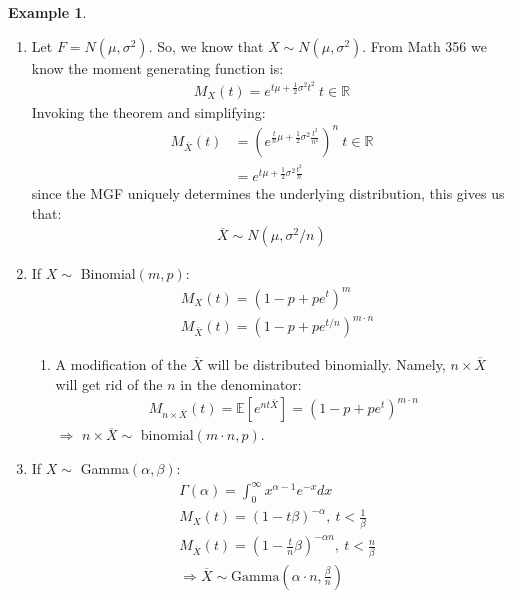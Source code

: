 \documentclass[11pt]{scrartcl}
\newcommand{\R}[0]{\mathbb{R}}
\theoremstyle{definition}
\newtheorem{ex}{Example}
\theoremstyle{remark}
\newcommand{\EX}[1]{\mathbb{E}\left[#1 \right]}
\newcommand{\idx}[2]{\int_{#1}^{#2}}
\begin{document}
{\begin{ex}
	\begin{enumerate}[noitemsep]
		\item Let $F = N(\mu, \sigma^2)$. So, we know that $X \sim N(\mu, \sigma^2)$. From Math 356 we know the moment generating function is: 
		\begin{align*}
			M_X(t) = e^{t\mu + \frac{1}{2} \sigma^2 t^2}\ t \in \R	
		\end{align*}
		Invoking the theorem and simplifying:  
		\begin{align*}
			M_{\overline{X}} (t) & = \left(e^{\frac{t}{n}\mu + \frac{1}{2} \sigma^2 \frac{t^2}{n^2}} \right)^n\ t \in \R	\\
			& = e^{t\mu + \frac{1}{2} \sigma^2\frac{t^2}{n}} 
		\end{align*}
		since the MGF uniquely determines the underlying distribution, this gives us that: 
		\begin{align*}
			\overline{X} \sim N(\mu, \sigma^2/n) 	
		\end{align*}
		\item If $X \sim $ Binomial$	(m, p)$: 
		\begin{align*}
			& M_X(t) = (1-p+pe^t)^m \\	
			& M_{\overline{X}}(t) = (1 - p + pe^{t/n})^{m \cdot n} 
		\end{align*}

		\begin{enumerate}[noitemsep]
			\item A modification of the $\overline{X}$ will be distributed binomially. Namely, $n \times \overline{X}$ will get rid of the $n$ in the denominator: 
			\begin{align*}
				M_{n \times \overline{X}} (t) = \EX{ e^{nt\overline{X}} } = (1-p+pe^t)^{m \cdot n } 	
			\end{align*}
			$ \Rightarrow $ $n \times \overline{X} \sim $ binomial$(m \cdot n, p)$. 
		\end{enumerate}
		\item If $X \sim $ Gamma$(\alpha, \beta)$: 
		\begin{align*}
			& \Gamma (\alpha) = \idx{0}{\infty} 	x ^{\alpha - 1} e^{-x} dx \\
			& M_X(t) = (1-t\beta)^{-\alpha},\ t < \frac{1}{\beta} \\
			& M_{\overline{X}}(t) = \left( 	1 - \frac{t}{n} \beta		\right)^{-\alpha n },\ t < \frac{n}{\beta} \\
			& \Rightarrow \overline{X} \sim \text{Gamma}\left( \alpha \cdot n, \frac{\beta}{n} \right) 
		\end{align*}
	\end{enumerate}
\end{ex}

}
\end{document}
